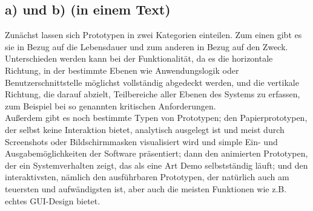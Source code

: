 \documentclass{swp1}
\begin{document}
\subsection*{a) und b) (in einem Text)}
Zunächst lassen sich Prototypen in zwei Kategorien einteilen. Zum einen gibt es sie in Bezug auf die Lebensdauer und zum anderen in Bezug auf den Zweck. Unterschieden werden kann bei der Funktionalität, da es die horizontale Richtung, in der bestimmte Ebenen wie Anwendungslogik oder Benutzerschnittstelle möglichst vollständig abgedeckt werden, und die vertikale Richtung, die darauf abzielt, Teilbereiche aller Ebenen des Systems zu erfassen, zum Beispiel bei so genannten kritischen Anforderungen. \\
Außerdem gibt es noch bestimmte Typen von Prototypen; den Papierprototypen, der selbst keine Interaktion bietet, analytisch ausgelegt ist und meist durch Screenshots oder Bildschirmmasken visualisiert wird und simple Ein- und Ausgabemöglichkeiten der Software präsentiert; dann den animierten Prototypen, der ein Systemverhalten zeigt, das als eine Art Demo selbstständig läuft; und den interaktivsten, nämlich den ausführbaren Prototypen, der natürlich auch am teuersten und aufwändigsten ist, aber auch die meisten Funktionen wie z.B. echtes GUI-Design bietet.\\
\end{document}
